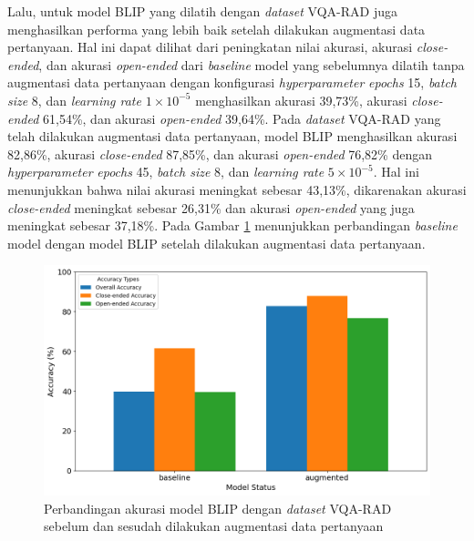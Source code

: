 \par Lalu, untuk model BLIP yang dilatih dengan \textit{dataset} VQA-RAD juga menghasilkan performa yang lebih baik setelah dilakukan augmentasi data pertanyaan. Hal ini dapat dilihat dari peningkatan nilai akurasi, akurasi \textit{close-ended}, dan akurasi \textit{open-ended} dari \textit{baseline} model yang sebelumnya dilatih tanpa augmentasi data pertanyaan dengan konfigurasi \textit{hyperparameter} \textit{epochs} 15, \textit{batch size} 8, dan \textit{learning rate} $1 \times 10^{-5}$ menghasilkan akurasi 39,73\%, akurasi \textit{close-ended} 61,54\%, dan akurasi \textit{open-ended} 39,64\%. Pada \textit{dataset} VQA-RAD yang telah dilakukan augmentasi data pertanyaan, model BLIP menghasilkan akurasi 82,86\%, akurasi \textit{close-ended} 87,85\%, dan akurasi \textit{open-ended} 76,82\% dengan \textit{hyperparameter} \textit{epochs} 45, \textit{batch size} 8, dan \textit{learning rate} $5 \times 10^{-5}$. Hal ini menunjukkan bahwa nilai akurasi meningkat sebesar 43,13\%, dikarenakan akurasi \textit{close-ended} meningkat sebesar 26,31\% dan akurasi \textit{open-ended} yang juga meningkat sebesar 37,18\%. Pada Gambar \ref{fig:perbandingan-akurasi-blip-vqa-rad} menunjukkan perbandingan \textit{baseline} model dengan model BLIP setelah dilakukan augmentasi data pertanyaan.

\begin{figure}[H]
  \centering
  \includegraphics[width=\textwidth]{image/bab4/blip-vqarad.png}
  \caption{Perbandingan akurasi model BLIP dengan \textit{dataset} VQA-RAD sebelum dan sesudah dilakukan augmentasi data pertanyaan}
  \label{fig:perbandingan-akurasi-blip-vqa-rad}
\end{figure}

